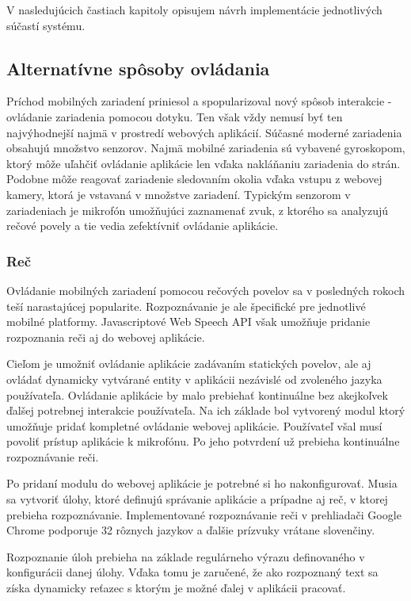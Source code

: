 V nasledujúcich častiach kapitoly opisujem návrh implementácie jednotlivých súčastí systému.

\subsection{Alternatívne spôsoby ovládania} %
\label{sub:alternat_vne_sp_soby_ovl_dania}

Príchod mobilných zariadení priniesol a spopularizoval nový spôsob interakcie - ovládanie zariadenia pomocou dotyku. Ten však vždy nemusí byť ten najvýhodnejší najmä v prostredí webových aplikácií. Súčasné moderné zariadenia obsahujú množstvo senzorov. Najmä mobilné zariadenia sú vybavené gyroskopom, ktorý môže uľahčiť ovládanie aplikácie len vďaka nakláňaniu zariadenia do strán. Podobne môže reagovať zariadenie sledovaním okolia vďaka vstupu z webovej kamery, ktorá je vstavaná v množstve zariadení. Typickým senzorom v zariadeniach je mikrofón umožňujúci zaznamenať zvuk, z ktorého sa analyzujú rečové povely a tie vedia zefektívniť ovládanie aplikácie.

\subsubsection{Reč} %
\label{ssub:re_}

Ovládanie mobilných zariadení pomocou rečových povelov sa v posledných rokoch teší narastajúcej popularite. Rozpoznávanie je ale špecifické pre jednotlivé mobilné platformy. Javascriptové Web Speech API však umožňuje pridanie rozpoznania reči aj do webovej aplikácie. 

Cieľom je umožniť ovládanie aplikácie zadávaním statických povelov, ale aj ovládať dynamicky vytvárané entity v aplikácii nezávislé od zvoleného jazyka používateľa. Ovládanie aplikácie by malo prebiehať kontinuálne bez akejkoľvek ďalšej potrebnej interakcie používateľa. Na ich základe bol vytvorený modul ktorý umožňuje pridať kompletné ovládanie webovej aplikácie. Používateľ všal musí povoliť prístup aplikácie k mikrofónu. Po jeho potvrdení už prebieha kontinuálne rozpoznávanie reči.

Po pridaní modulu do webovej aplikácie je potrebné si ho nakonfigurovať. Musia sa vytvoriť úlohy, ktoré definujú správanie aplikácie a prípadne aj reč, v ktorej prebieha rozpoznávanie. Implementované rozpoznávanie reči v prehliadači Google Chrome podporuje 32 rôznych jazykov a ďalšie prízvuky vrátane slovenčiny.

Rozpoznanie úloh prebieha na základe regulárneho výrazu definovaného v konfigurácii danej úlohy. Vďaka tomu je zaručené, že ako rozpoznaný text sa získa dynamicky reťazec s ktorým je možné ďalej v aplikácii pracovať. 

